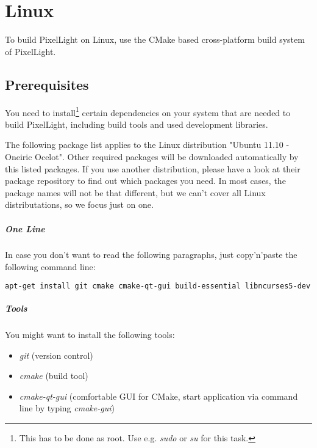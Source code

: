 \chapter{Linux}
To build PixelLight on Linux, use the CMake based cross-platform build system of PixelLight.




\section{Prerequisites}
You need to install\footnote{This has to be done as root. Use e.g. \emph{sudo} or \emph{su} for this task.} certain dependencies on your system that are needed to build PixelLight, including build tools and used development libraries.

The following package list applies to the Linux distribution "Ubuntu 11.10 - Oneiric Ocelot". Other required packages will be downloaded automatically by this listed packages. If you use another distribution, please have a look at their package repository to find out which packages you need. In most cases, the package names will not be that different, but we can't cover all Linux distributations, so we focus just on one.


\paragraph{One Line}
In case you don't want to read the following paragraphs, just copy'n'paste the following command line:
\begin{lstlisting}[language=sh]
apt-get install git cmake cmake-qt-gui build-essential libncurses5-dev libxext-dev libxcursor-dev libdbus-1-dev libxxf86vm-dev libxrandr-dev libglu1-mesa-dev doxygen graphviz texlive texlive-science
\end{lstlisting}


\paragraph{Tools}
You might want to install the following tools:
\begin{itemize}
\item{\emph{git} (version control)}
\item{\emph{cmake} (build tool)}
\item{\emph{cmake-qt-gui} (comfortable GUI for CMake, start application via command line by typing \emph{cmake-gui})}
\end{itemize}

